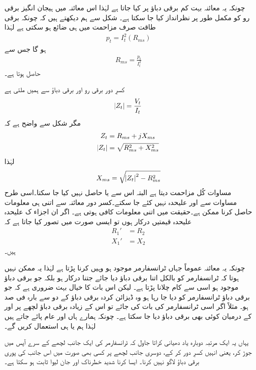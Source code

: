  چونکہ یہ معائنہ بہت کم برقی دباؤ پر کیا جاتا ہے لہٰذا اس معائنہ میں ہیجان انگیز برقی رو کو مکمل طور پر نظرانداز کیا جا سکتا ہے۔ شکل سے ہم دیکھتے ہیں کہ چونکہ برقی طاقت صرف مزاحمت میں ہی ضائع ہو سکتی ہے لہٰذا
\begin{align*}
p_t=I_t^2 \left(R_{ms}\right)
\end{align*}
ہو گا جس سے
\begin{align}\label{مساوات_ٹرانسفارمر_کسر_دور_مزاحمت_حاصل}
R_{ms}=\frac{p_t}{I_t^2}
\end{align}
حاصل ہوتا ہے۔

کسرِ دور برقی رو اور برقی دباؤ سے ہمیں ملتی ہے
\begin{align*}
\abs{Z_t}=\frac{V_t}{I_t}
\end{align*}
مگر شکل سے واضح ہے کہ
\begin{align*}
Z_t&=R_{ms}+j X_{ms}\\
\abs{Z_t}&=\sqrt{R_{ms}^2+X_{ms}^2}
\end{align*}
لہٰذا
\begin{align}\label{مساوات_ٹرانسفارمر_کسر_دور_امالہ_حاصل}
X_{ms}=\sqrt{\abs{Z_t}^2-R_{ms}^2}
\end{align}
مساوات  کُل مزاحمت دیتا ہے البتہ اس سے  یا  حاصل نہیں کیا جا سکتا۔اسی طرح مساوات  سے  اور  علیحدہ نہیں کئے جا سکتے۔کسر دور معائنہ سے اتنی ہی معلومات حاصل کرنا ممکن ہے۔حقیقت میں اتنی معلومات کافی ہوتی ہے۔ اگر ان اجزاء ک علیحدہ علیحدہ قیمتیں درکار ہوں تو ایسی صورت میں تصور کیا جاتا ہے کہ
\begin{align*}
R_1'&=R_2\\
X_1'&=X_2
\end{align*}
ہیں۔

 چونکہ یہ معائنہ عموماً جہاں ٹرانسفارمر موجود ہو وہیں کرنا پڑتا ہے لہٰذا یہ ممکن نہیں ہوتا کہ ٹرانسفارمر کو بالکل اتنا برقی دباؤ دیا جائے جتنا درکار ہو بلکہ جو برقی دباؤ موجود ہو اسی سے کام چلانا پڑتا ہے۔ لیکن اس بات کا خیال بہت ضروری ہے کہ جو برقی دباؤ ٹرانسفارمر کو دیا جا رہا ہو وہ ڈیزائن کردہ برقی دباؤ کے دو سے بارہ  فی صد ہو۔ مثلاً اگر اسی  ٹرانسفارمر کی بات کی جائے تو اس کے زیادہ برقی دباؤ لچھے پر  اور   کے درمیان کوئی بھی برقی دباؤ دیا جا سکتا ہے۔ چونکہ ہمارے ہاں   اور   عام پائے جاتے ہیں لہٰذا ہم   یا   ہی استعمال کریں گے۔

یہاں یہ ایک مرتبہ دوبارہ یاد دھیانی کراتا جاول کہ ٹرانسفارمر کی ایک جانب لچھے کے سرے آپس میں جوڑ کر، یعنی انہیں کسرِ دور کر کے، دوسری جانب لچھے پر کسی بھی صورت میں اس جانب کی پوری برقی دباؤ لاگو نہیں کرنا۔ ایسا کرنا  شدید  خطرناک اور جان لیوا ثابت ہو سکتا ہے۔

